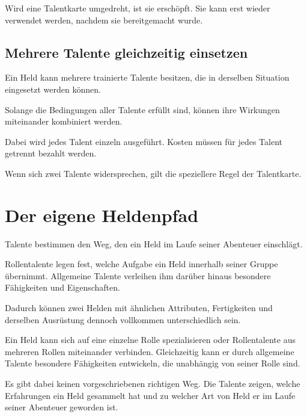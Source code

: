Wird eine Talentkarte umgedreht, ist sie erschöpft. Sie kann erst wieder verwendet werden, nachdem sie bereitgemacht wurde.

\subsection{Mehrere Talente gleichzeitig einsetzen}

Ein Held kann mehrere trainierte Talente besitzen, die in derselben Situation eingesetzt werden können.

Solange die Bedingungen aller Talente erfüllt sind, können ihre Wirkungen miteinander kombiniert werden.

Dabei wird jedes Talent einzeln ausgeführt. Kosten müssen für jedes Talent getrennt bezahlt werden.

Wenn sich zwei Talente widersprechen, gilt die speziellere Regel der Talentkarte.

\section{Der eigene Heldenpfad}

Talente bestimmen den Weg, den ein Held im Laufe seiner Abenteuer einschlägt.

Rollentalente legen fest, welche Aufgabe ein Held innerhalb seiner Gruppe übernimmt. Allgemeine Talente verleihen ihm darüber hinaus besondere Fähigkeiten und Eigenschaften.

Dadurch können zwei Helden mit ähnlichen Attributen, Fertigkeiten und derselben Ausrüstung dennoch vollkommen unterschiedlich sein.

Ein Held kann sich auf eine einzelne Rolle spezialisieren oder Rollentalente aus mehreren Rollen miteinander verbinden. Gleichzeitig kann er durch allgemeine Talente besondere Fähigkeiten entwickeln, die unabhängig von seiner Rolle sind.

Es gibt dabei keinen vorgeschriebenen richtigen Weg. Die Talente zeigen, welche Erfahrungen ein Held gesammelt hat und zu welcher Art von Held er im Laufe seiner Abenteuer geworden ist.
